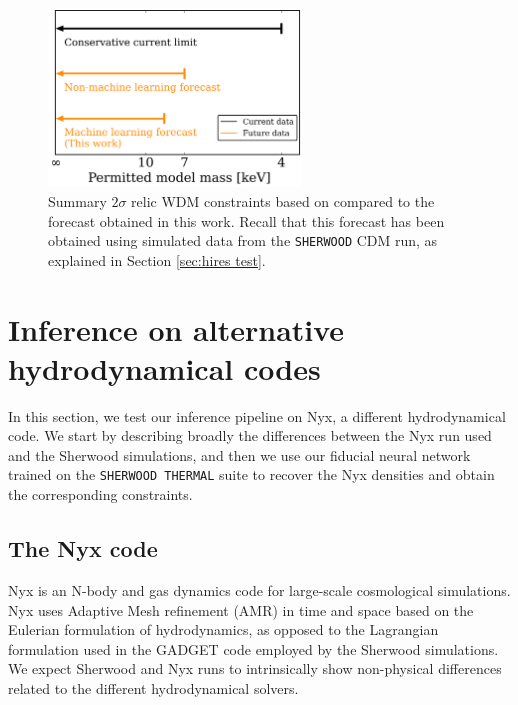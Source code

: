 \begin{figure}
    \centering
    \includegraphics[width=0.6\textwidth]{img/ML/limits_summary.png}
    \caption{Summary $2\sigma$ relic WDM constraints based on \cite{sherwood_wdm} compared to the forecast obtained in this work. Recall that this forecast has been obtained using simulated data from the \texttt{SHERWOOD} CDM run, as explained in Section \ref{sec:hires test}.}
    \label{fig: wdm constraints summary}
\end{figure}













\section{Inference on alternative hydrodynamical codes}
In this section, we test our inference pipeline on Nyx, a different hydrodynamical code. We start by describing broadly the differences between the Nyx run used and the Sherwood simulations, and then we use our fiducial neural network trained on the \texttt{SHERWOOD THERMAL} suite to recover the Nyx densities and obtain the corresponding constraints.


\subsection{The Nyx code}
Nyx \cite{Almgren_2013} is an N-body and gas dynamics code for large-scale cosmological simulations. Nyx uses Adaptive Mesh refinement (AMR) in time and space based on the Eulerian formulation of hydrodynamics, as opposed to the Lagrangian formulation used in the GADGET code employed by the Sherwood simulations. We expect Sherwood and Nyx runs to intrinsically show non-physical differences related to the different hydrodynamical solvers.

